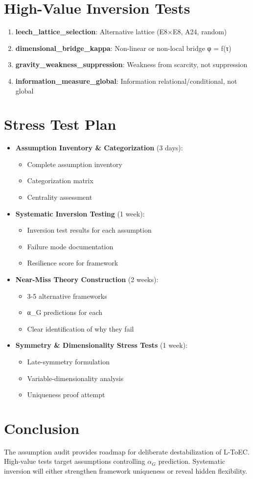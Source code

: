 \documentclass[11pt]{article}
\begin{document}
\section{High-Value Inversion Tests}

\begin{enumerate}
\item \textbf{leech\_lattice\_selection}: Alternative lattice (E8×E8, A24, random)
\item \textbf{dimensional\_bridge\_kappa}: Non-linear or non-local bridge φ = f(τ)
\item \textbf{gravity\_weakness\_suppression}: Weakness from scarcity, not suppression
\item \textbf{information\_measure\_global}: Information relational/conditional, not global
\end{enumerate}

\section{Stress Test Plan}

\begin{itemize}
\item \textbf{Assumption Inventory & Categorization} (3 days):
\begin{itemize}
\item Complete assumption inventory
\item Categorization matrix
\item Centrality assessment
\end{itemize}
\item \textbf{Systematic Inversion Testing} (1 week):
\begin{itemize}
\item Inversion test results for each assumption
\item Failure mode documentation
\item Resilience score for framework
\end{itemize}
\item \textbf{Near-Miss Theory Construction} (2 weeks):
\begin{itemize}
\item 3-5 alternative frameworks
\item α_G predictions for each
\item Clear identification of why they fail
\end{itemize}
\item \textbf{Symmetry & Dimensionality Stress Tests} (1 week):
\begin{itemize}
\item Late-symmetry formulation
\item Variable-dimensionality analysis
\item Uniqueness proof attempt
\end{itemize}
\end{itemize}

\section*{Conclusion}

The assumption audit provides roadmap for deliberate destabilization of L-ToEC.
High-value tests target assumptions controlling $\alpha_G$ prediction.
Systematic inversion will either strengthen framework uniqueness or reveal
hidden flexibility.
\end{document}
